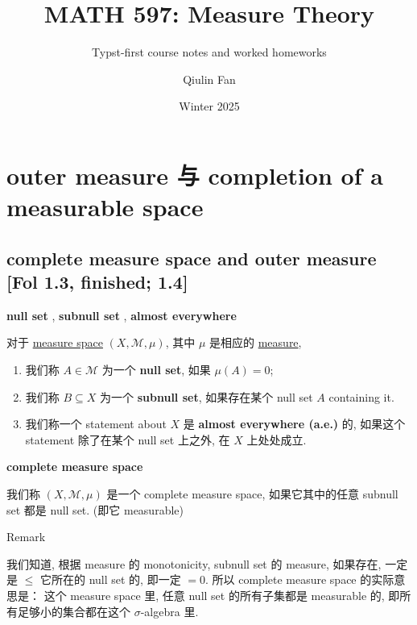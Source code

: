\documentclass{qlnotes-export}
\title{MATH 597: Measure Theory}
\subtitle{Typst-first course notes and worked homeworks}
\author{Qiulin Fan}
\date{Winter 2025}
\begin{document}
\mainmatter
\chapter{outer measure 与 completion of a measurable space}\label{outer-measure-ux4e0e-completion-of-a-measurable-space}

\section{complete measure space and outer measure {[}Fol 1.3, finished; 1.4{]}}

\begin{definition}{\protect{}\label{kn-nul-set-subnull-set-almost-everywhere}{\textbf{null
set}} , \protect{}\label{kn-subnull-set}{\textbf{subnull
set}} ,
\protect{}\label{kn-almost-everywhere}{\textbf{almost
everywhere}}}

对于 \href{https://qiulinfan.github.io/notes/math/measure-theory/\#kn-measure-space}{measure space} \((X,\mathcal{M},\mu)\), 其中 \(\mu\) 是相应的 \href{https://qiulinfan.github.io/notes/math/measure-theory/\#kn-measure}{measure},

\begin{enumerate}
\item
  我们称 \(A \in \mathcal{M}\) 为一个 \textbf{null set}, 如果 \(\mu(A) = 0\);
\item
  我们称 \(B \subseteq X\) 为一个 \textbf{subnull set}, 如果存在某个 null set \(A\) containing it.
\item
  我们称一个 statement about \(X\) 是 \textbf{almost everywhere (a.e.)} 的, 如果这个 statement 除了在某个 null set 上之外, 在 \(X\) 上处处成立.
\end{enumerate}

\end{definition}

\begin{definition}{\protect{}\label{kn-complete-measure-space}{\textbf{complete
measure space}}}

我们称 \((X,\mathcal{M},\mu)\) 是一个 complete measure space, 如果它其中的任意 subnull set 都是 null set. (即它 measurable)

\end{definition}

\begin{qlremark}{Remark}

我们知道, 根据 measure 的 monotonicity, subnull set 的 measure, 如果存在, 一定是 \(\leq\) 它所在的 null set 的, 即一定 \(= 0\). 所以 complete measure space 的实际意思是： 这个 measure space 里, 任意 null set 的所有子集都是 measurable 的, 即所有足够小的集合都在这个 \(\sigma\)-algebra 里.

\end{qlremark}
\end{document}
